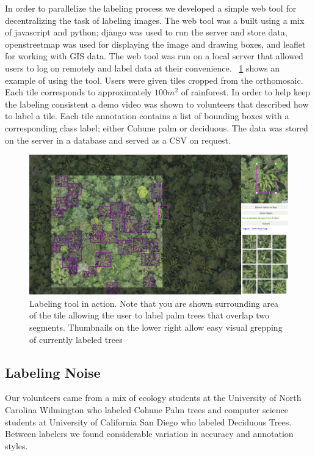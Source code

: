 In order to parallelize the labeling process we developed a simple web tool for decentralizing the task of labeling images. The web tool was a built using a mix of javascript and python; django was used to run the server and store data, openstreetmap was used for displaying the image and drawing boxes, and leaflet for working with GIS data. The web tool was run on a local server that allowed users to log on remotely and label data at their convenience. ~\ref{fig:LabelingTool} shows an example of using the tool. Users were given tiles cropped from the orthomosaic. Each tile corresponds to approximately $100m^2$ of rainforest. In order to help keep the labeling consistent a demo video was shown to volunteers that described how to label a tile. Each tile annotation contains a list of bounding boxes with a corresponding class label; either Cohune palm or deciduous. The data was stored on the server in a database and served as a CSV on request.

\begin{figure}[ht]
\includegraphics[width=1.0\textwidth]{Figures/LabelingTool.png}
\caption{Labeling tool in action. Note that you are shown surrounding area of the tile allowing the user to label palm trees that overlap two segments. Thumbnails on the lower right allow easy visual grepping of currently labeled trees}
\label{fig:LabelingTool}
\end{figure}

\subsection{Labeling Noise}

Our volunteers came from a mix of ecology students at the University of North Carolina Wilmington who labeled Cohune Palm trees and computer science students at University of California San Diego who labeled Deciduous Trees. Between labelers we found considerable variation in accuracy and annotation styles.

